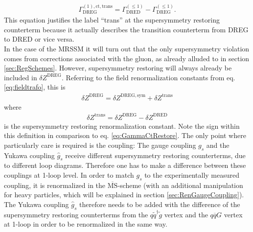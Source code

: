 \begin{align}
\Gamma^{\mathrm{(1),ct,trans}}_{\mathrm{DREG}} = \Gamma^{(\leq 1)}_{\mathrm{DRED}} - \Gamma^{(\leq 1)}_{\mathrm{DREG}}.\label{eq:GammaCtRestore}
\end{align} 
This equation justifies the label ``trans'' at the supersymmetry restoring counterterm because it actually describes the transition counterterm from DREG to DRED or vice versa.\\ %
In the case of the MRSSM it will turn out that the only supersymmetry violation comes from corrections associated with the gluon, as already alluded to in section \ref{sec:RegSchemes}. However, supersymmetry restoring will always already be included in $\delta Z^{\mathrm{DREG}}$. Referring to the field renormalization constants from eq. \eqref{eq:fieldtrafo}, this is 
\begin{align}
\delta Z^{\mathrm{DREG}} = \delta Z^{\mathrm{DREG,sym}} + \delta Z^{\mathrm{trans}}
\end{align}
where 
\begin{align}
\delta Z^{\mathrm{trans}} = \delta Z^{\mathrm{DREG}} - \delta Z^{\mathrm{DRED}}
\end{align}
is the supersymmetry restoring renormalization constant. Note the sign within this definition in comparison to eq. \eqref{eq:GammaCtRestore}. The only point where particularly care is required is the coupling: The  gauge coupling $g_s$ and the Yukawa coupling $\hat{g}_s$ receive different supersymmetry restoring counterterms, due to different loop diagrams. Therefore one has to make a difference between these couplings at 1-loop level. In order to match $g_s$ to the experimentally measured coupling, it is renormalized in the  $\overline{\mathrm{MS}}$-scheme (with an additional manipulation for heavy particles, which will be explained in section \ref{sec:RenGaugeCoupling}). The Yukawa coupling $\hat{g}_s$ therefore needs to be added with the difference of the supersymmetry restoring counterterms from the $q\tilde{q}^\dagger\tilde{g}$ vertex and the $q\overline{q}G$ vertex at 1-loop in order to be renormalized in the same way.




